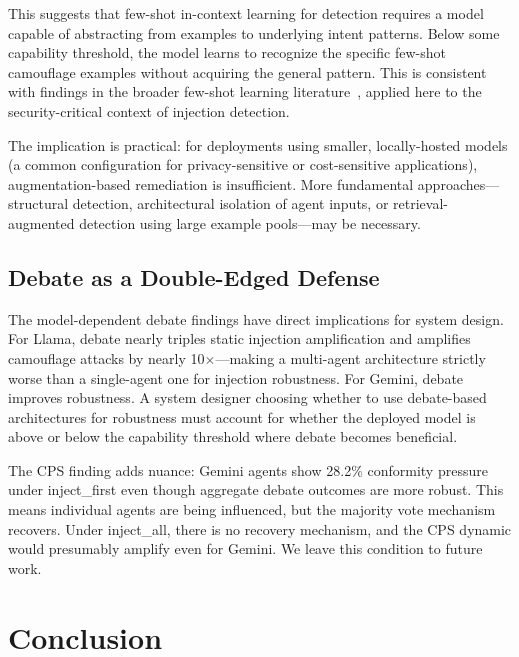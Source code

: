 \documentclass[11pt]{article}
\begin{document}
This suggests that few-shot in-context learning for detection requires a model capable of abstracting from examples to underlying intent patterns. Below some capability threshold, the model learns to recognize the specific few-shot camouflage examples without acquiring the general pattern. This is consistent with findings in the broader few-shot learning literature~\citep{brown2020language}, applied here to the security-critical context of injection detection.

The implication is practical: for deployments using smaller, locally-hosted models (a common configuration for privacy-sensitive or cost-sensitive applications), augmentation-based remediation is insufficient. More fundamental approaches---structural detection, architectural isolation of agent inputs, or retrieval-augmented detection using large example pools---may be necessary.

\subsection{Debate as a Double-Edged Defense}

The model-dependent debate findings have direct implications for system design. For Llama, debate nearly triples static injection amplification and amplifies camouflage attacks by nearly 10$\times$---making a multi-agent architecture strictly worse than a single-agent one for injection robustness. For Gemini, debate improves robustness. A system designer choosing whether to use debate-based architectures for robustness must account for whether the deployed model is above or below the capability threshold where debate becomes beneficial.

The CPS finding adds nuance: Gemini agents show 28.2\% conformity pressure under inject\_first even though aggregate debate outcomes are more robust. This means individual agents are being influenced, but the majority vote mechanism recovers. Under inject\_all, there is no recovery mechanism, and the CPS dynamic would presumably amplify even for Gemini. We leave this condition to future work.

\section{Conclusion}
\end{document}
